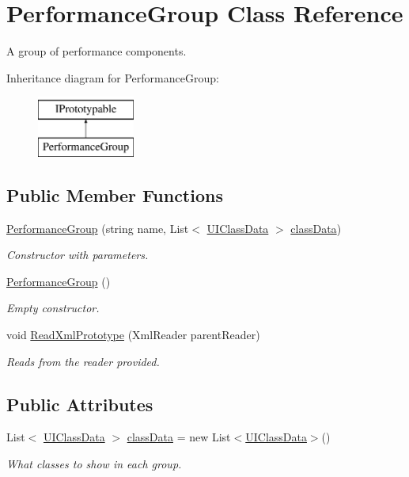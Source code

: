 \hypertarget{class_performance_group}{}\section{Performance\+Group Class Reference}
\label{class_performance_group}


A group of performance components.  


Inheritance diagram for Performance\+Group\+:\begin{figure}[H]
\begin{center}
\leavevmode
\includegraphics[height=2.000000cm]{class_performance_group}
\end{center}
\end{figure}
\subsection*{Public Member Functions}
\begin{DoxyCompactItemize}
\item 
\hyperlink{class_performance_group_a47f33a89205365df4b464e20277d1b1b}{Performance\+Group} (string name, List$<$ \hyperlink{struct_u_i_class_data}{U\+I\+Class\+Data} $>$ \hyperlink{class_performance_group_a95898308ffc858a8fc045380952234a7}{class\+Data})
\begin{DoxyCompactList}\small\item\em Constructor with parameters. \end{DoxyCompactList}\item 
\hyperlink{class_performance_group_ad6c5d883468c6505a052523f7c63a598}{Performance\+Group} ()
\begin{DoxyCompactList}\small\item\em Empty constructor. \end{DoxyCompactList}\item 
void \hyperlink{class_performance_group_a2be3d2af8490e938844a93d5ce9044bd}{Read\+Xml\+Prototype} (Xml\+Reader parent\+Reader)
\begin{DoxyCompactList}\small\item\em Reads from the reader provided. \end{DoxyCompactList}\end{DoxyCompactItemize}
\subsection*{Public Attributes}
\begin{DoxyCompactItemize}
\item 
List$<$ \hyperlink{struct_u_i_class_data}{U\+I\+Class\+Data} $>$ \hyperlink{class_performance_group_a95898308ffc858a8fc045380952234a7}{class\+Data} = new List$<$\hyperlink{struct_u_i_class_data}{U\+I\+Class\+Data}$>$()
\begin{DoxyCompactList}\small\item\em What classes to show in each group. \end{DoxyCompactList}\end{DoxyCompactItemize}
